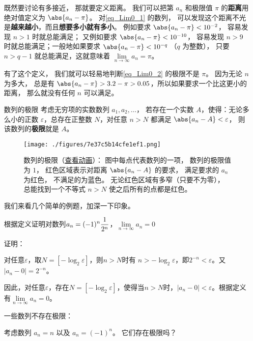 既然要讨论有多接近， 那就要定义距离。 我们可以把第 $a_n$ 和极限值 $\pi$ 的\textbf{距离}用绝对值定义为 $\abs{a_n - \pi}$。 对\autoref{eq_Lim0_1} 的数列， 可以发现这个距离不光是\textbf{越来越小}，而且\textbf{想要多小就有多小}。 例如要求 $\abs{a_n - \pi} < 10^{-2}$， 容易发现 $n > 1$ 时就总能满足； 又例如要求 $\abs{a_n - \pi} < 10^{-10}$， 容易发现 $n > 9$ 时就总能满足；一般地如果要求 $\abs{a_n - \pi} < 10^{-q}$ （$q$ 为整数）， 只要 $n > q-1$ 就总能满足，这就意味着 $\lim\limits_{n \to \infty } a_n = \pi$。

有了这个定义， 我们就可以轻易地判断\autoref{eq_Lim0_2} 的极限不是 $\pi$。 因为无论 $n$ 为多大， 总是有 $\abs{a_n - \pi} > 3.2 - \pi > 0.05$，所以如果要求一个比这更小的距离， 那么就没有任何 $n$ 可以满足。

\begin{definition}{数列的极限}\label{def_Lim0_2}
考虑无穷项的实数数列 $a_1, a_2, \dots$， 若存在一个实数 $A$，使得：无论多么小的正数 $\varepsilon$，总存在正整数 $N$，对任意 $n > N$ 都满足 $\abs{a_n - A} < \varepsilon$， 则该数列的\textbf{极限}就是 $A$。
\end{definition}

\begin{figure}[ht]
\centering
\texttt{[image: ./figures/7e37c5b14cfe1ef1.png]}
\caption{数列的极限（\href{https://wuli.wiki/apps/Lim0.html}{查看动画}）： 图中每点代表数列的一项， 数列的极限值为 $1$， 红色区域表示对距离 $\abs{a_n - A}$ 的要求， 满足要求的 $a_n$ 为红色， 不满足的为蓝色。 无论红色区域有多窄（只要不为零）， 总能找到一个不等式 $n > N$ 使之后所有的点都是红色。} \label{fig_Lim0_1}
\end{figure}

我们来看几个简单的例题，加深一下印象。

\begin{example}{根据定义证明对数列$\displaystyle a_n= {(-1)^n}{1\over{2^n}}$，$\lim\limits_{n\to\infty}a_n=0$}


证明：

对任意$\varepsilon$，取$N=[-\log_2\varepsilon]$，则$n>N$时有
$n>-\log_2\varepsilon$，即$2^{-n}<\varepsilon$。又$|a_n-0|=2^{-n}$。

因此，对任意$\varepsilon$，存在$N=[-\log_2\varepsilon]$，使得当$n>N$时，$|a_n-0|<\varepsilon$。根据定义有$\lim\limits_{n\to\infty}a_n=0$。
\end{example}

一些数列不存在极限：
\begin{exercise}{}\label{exe_Lim0_10}
考虑数列 $a_n = n$ 以及 $a_n=(-1)^n$。 它们存在极限吗？
\end{exercise}


